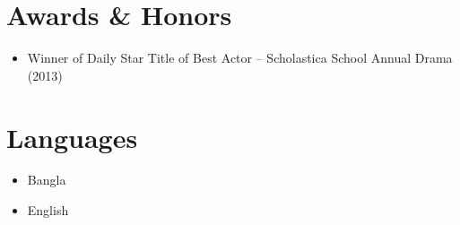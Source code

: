 \documentclass[letterpaper,11pt]{article}
\newcommand{\resumeItem}[1]{
  \item\small{
    {#1 \vspace{-2pt}}
  }
}
\newcommand{\resumeItemListStart}{\begin{itemize}}
\newcommand{\resumeItemListEnd}{\end{itemize}\vspace{-5pt}}
\begin{document}
\section{Awards \& Honors}
  \resumeItemListStart
    \resumeItem{Winner of Daily Star Title of Best Actor -- Scholastica School Annual Drama (2013)}
  \resumeItemListEnd

\section{Languages}
  \resumeItemListStart
    \resumeItem{Bangla}
    \resumeItem{English}
  \resumeItemListEnd

\end{document}
